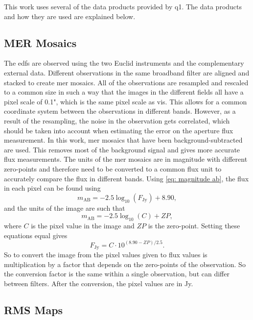 This work uses several of the data products provided by \gls{q1}. The data products and how they are used are explained below.

\subsection{MER Mosaics}

The \glspl{edf} are observed using the two Euclid instruments and the complementary external data. Different observations in the same broadband filter are aligned and stacked to create \gls{mer} mosaics. All of the observations are resampled and rescaled to a common size in such a way that the images in the different fields all have a pixel scale of 0.1", which is the same pixel scale as \gls{vis}. This allows for a common coordinate system between the observations in different bands. However, as a result of the resampling, the noise in the observation gets correlated, which should be taken into account when estimating the error on the aperture flux measurement.
In this work, \gls{mer} mosaics that have been background-subtracted are used. This removes most of the background signal and gives more accurate flux measurements. The units of the \gls{mer} mosaics are in magnitude with different zero-points and therefore need to be converted to a common flux unit to accurately compare the flux in different bands. Using \autoref{eq: magnitude ab}, the flux in each pixel can be found using
\begin{equation}
    m_\mathrm{AB}=-2.5\log_{10}\left(F_\mathrm{Jy}\right) + 8.90,
\end{equation}
and the units of the image are such that
\begin{equation}
    m_\mathrm{AB}=-2.5\log_{10}\left(C\right) + ZP,
\end{equation}
where $C$ is the pixel value in the image and $ZP$ is the zero-point. Setting these equations equal gives
\begin{equation}\label{eq: zeropoints correction}
    F_\mathrm{Jy} = C\cdot10^{(8.90-ZP)/2.5}.
\end{equation}
So to convert the image from the pixel values given to flux values is multiplication by a factor that depends on the zero-points of the observation. So the conversion factor is the same within a single observation, but can differ between filters. After the conversion, the pixel values are in Jy.

\subsection{RMS Maps}

